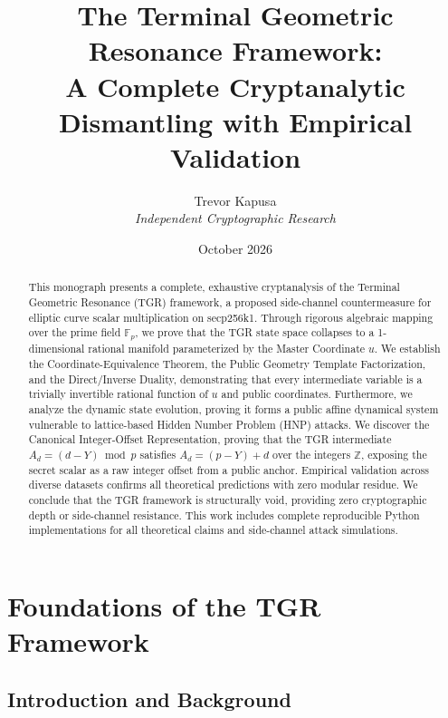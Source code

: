 \documentclass[11pt, a4paper, twoside]{book}
\title{\textbf{The Terminal Geometric Resonance Framework:} \\ \large A Complete Cryptanalytic Dismantling with Empirical Validation}
\author{Trevor Kapusa \\ \textit{Independent Cryptographic Research}}
\date{October 2026}
\begin{document}
\frontmatter
\maketitle

\begin{abstract}
This monograph presents a complete, exhaustive cryptanalysis of the Terminal Geometric Resonance (TGR) framework, a proposed side-channel countermeasure for elliptic curve scalar multiplication on secp256k1. Through rigorous algebraic mapping over the prime field $\mathbb{F}_p$, we prove that the TGR state space collapses to a 1-dimensional rational manifold parameterized by the Master Coordinate $u$. We establish the Coordinate-Equivalence Theorem, the Public Geometry Template Factorization, and the Direct/Inverse Duality, demonstrating that every intermediate variable is a trivially invertible rational function of $u$ and public coordinates. Furthermore, we analyze the dynamic state evolution, proving it forms a public affine dynamical system vulnerable to lattice-based Hidden Number Problem (HNP) attacks. We discover the Canonical Integer-Offset Representation, proving that the TGR intermediate $A_d = (d - Y) \bmod p$ satisfies $A_d = (p - Y) + d$ over the integers $\mathbb{Z}$, exposing the secret scalar as a raw integer offset from a public anchor. Empirical validation across diverse datasets confirms all theoretical predictions with zero modular residue. We conclude that the TGR framework is structurally void, providing zero cryptographic depth or side-channel resistance. This work includes complete reproducible Python implementations for all theoretical claims and side-channel attack simulations.
\end{abstract}

\tableofcontents

\mainmatter

\part{Foundations of the TGR Framework}

\chapter{Introduction and Background}
\end{document}
